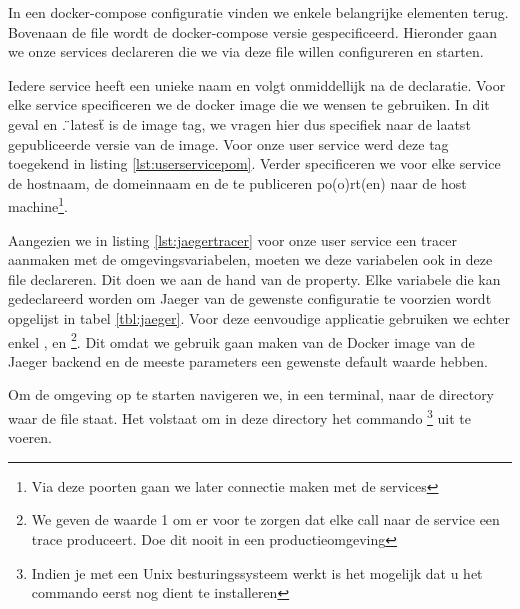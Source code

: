 In een docker-compose configuratie vinden we enkele belangrijke elementen terug. Bovenaan de file wordt de docker-compose versie gespecificeerd. Hieronder gaan we onze services declareren die we via deze file willen configureren en starten.

Iedere service heeft een unieke naam en volgt onmiddellijk na de  declaratie. Voor elke service specificeren we de docker image die we wensen te gebruiken. In dit geval  en . \"{}latest\"{} is de image tag, we vragen hier dus specifiek naar de laatst gepubliceerde versie van de image. Voor onze user service werd deze tag toegekend in listing \ref{lst:userservicepom}. Verder specificeren we voor elke service de hostnaam, de domeinnaam en de te publiceren po(o)rt(en) naar de host machine\footnote{Via deze poorten gaan we later connectie maken met de services}.

Aangezien we in listing \ref{lst:jaegertracer} voor onze user service een tracer aanmaken met de omgevingsvariabelen, moeten we deze variabelen ook in deze file declareren. Dit doen we aan de hand van de  property. Elke variabele die kan gedeclareerd worden om Jaeger van de gewenste configuratie te voorzien wordt opgelijst in tabel \ref{tbl:jaeger}. Voor deze eenvoudige applicatie gebruiken we echter enkel ,  en \footnote{We geven de waarde 1 om er voor te zorgen dat elke call naar de service een trace produceert. Doe dit nooit in een productieomgeving}. Dit omdat we gebruik gaan maken van de Docker image van de Jaeger backend en de meeste parameters een gewenste default waarde hebben.


Om de omgeving op te starten navigeren we, in een terminal, naar de directory waar de  file staat. Het volstaat om in deze directory het commando \footnote{Indien je met een Unix besturingssysteem werkt is het mogelijk dat u het commando eerst nog dient te installeren} uit te voeren.

